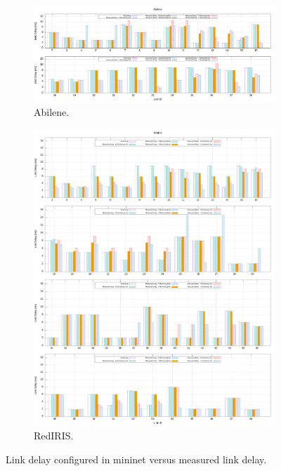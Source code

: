 \documentclass[10pt, journal, letterpaper]{IEEEtran}
\begin{document}
\begin{figure}
    \begin{subfigure}{\columnwidth}
      \centering
      \includegraphics[width=\columnwidth]{img/eval_Abilene_link_delay_real_and_measured.png}
      \caption{Abilene.}
      \label{fig:real_delay_abile}
    \end{subfigure}
    \begin{subfigure}{\columnwidth}
      \centering
      \includegraphics[width=\columnwidth]{img/eval_Rediris_link_delay_real_and_measured.png}
     \caption{RedIRIS.}
     \label{fig:real_delay_rediris}
    \end{subfigure}
    \caption{Link delay configured in mininet versus measured link delay.}
    \label{fig:real_delay_abile}
\end{figure}
\end{document}
